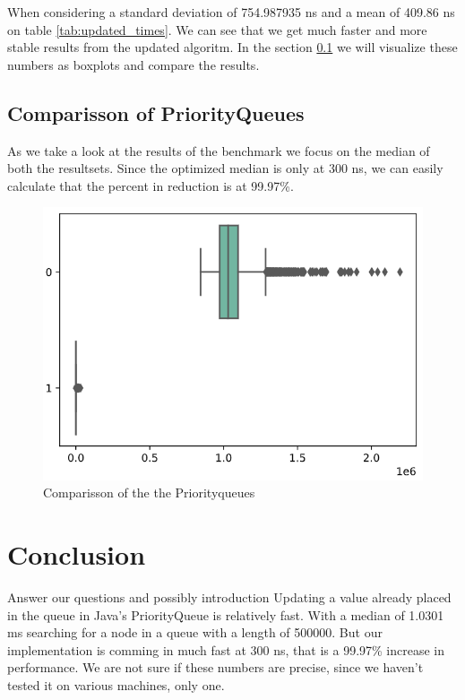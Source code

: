 \documentclass{article}
\begin{document}
When considering a standard deviation of 754.987935 ns and a mean of 409.86 ns on table \ref{tab:updated_times}.
We can see that we get much faster and more stable results from the updated algoritm. In the section
\ref{sec:comparisson_of_priorityqueues} we will
visualize these numbers as boxplots and compare the results.


\subsection{Comparisson of PriorityQueues} %
\label{sec:comparisson_of_priorityqueues}
As we take a look at the results of the benchmark we focus on the median of both the resultsets. 
Since the optimized median is only at 300 ns, we can easily calculate that the percent in reduction is at 99.97\%.




\begin{figure}[h]
\label{img:boxplot_comparisson}
\includegraphics[width=\textwidth]{boxplot_comparisson}
\caption{Comparisson of the the Priorityqueues}
\end{figure}


\section{Conclusion} %
Answer our questions and possibly introduction
Updating a value already placed in the queue in Java's PriorityQueue is relatively
fast. With a median of 1.0301 ms searching for a node in a queue with a length of 
500000. But our implementation is comming in much fast at 300 ns, that is a 99.97\% 
increase in performance. We are not sure if these numbers are precise, since we haven't 
tested it on various machines, only one. 




\end{document}
